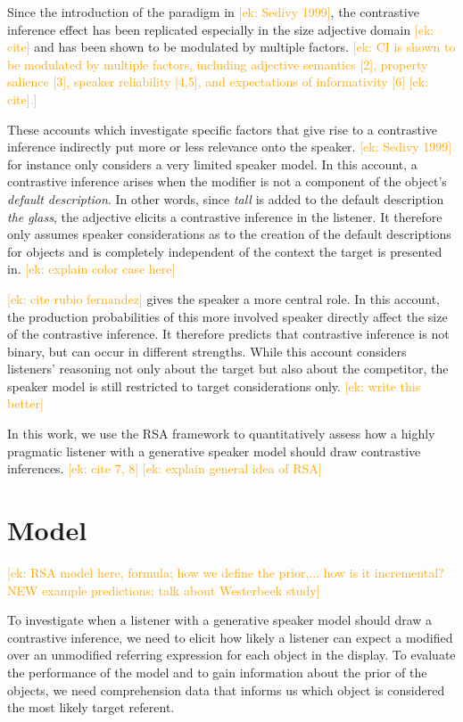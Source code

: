 \documentclass[10pt,letterpaper]{article}
\newcommand{\ek}[1]{\textcolor{Orange}{[ek: #1]}}
\begin{document}
Since the introduction of the paradigm in \ek{Sedivy 1999}, the contrastive inference effect has been replicated especially in the size adjective domain \ek{cite} and has been shown to be modulated by multiple factors. \ek{CI is shown to be modulated by multiple factors, including adjective semantics [2], property salience [3], speaker reliability [4,5], and expectations of informativity [6] \ek{cite}.} 

These accounts which investigate specific factors that give rise to a contrastive inference indirectly put more or less relevance onto the speaker.
\ek{Sedivy 1999} for instance only considers a very limited speaker model. In this account, a contrastive inference arises when the modifier is not a component of the object's \textit{default description}. In other words, since \textit{tall} is added to the default description \textit{the glass}, the adjective elicits a contrastive inference in the listener. It therefore only assumes speaker considerations as to the creation of the default descriptions for objects and is completely independent of the context the target is presented in. \ek{explain color case here}

\ek{cite rubio fernandez} gives the speaker a more central role. In this account, the production probabilities of this more involved speaker directly affect the size of the contrastive inference. It therefore predicts that contrastive inference is not binary, but can occur in different strengths. While this account considers listeners' reasoning not only about the target but also about the competitor, the speaker model is still restricted to target considerations only. \ek{write this better}

In this work, we use the RSA framework to quantitatively assess how a highly pragmatic listener with a generative speaker model should draw contrastive inferences. \ek{cite 7, 8} \ek{explain general idea of RSA}


\section{Model}

\ek{RSA model here, formula; how we define the prior,...
how is it incremental? NEW
example predictions;
talk about Westerbeek study}

To investigate when a listener with a generative speaker model should draw a contrastive inference, we need to elicit how likely a listener can expect a modified over an unmodified referring expression for each object in the display. To evaluate the performance of the model and to gain information about the prior of the objects, we need comprehension data that informs us which object is considered the most likely target referent.
\end{document}
